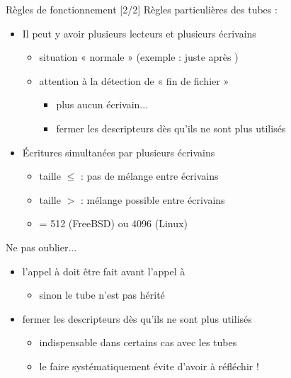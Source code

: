 \begin {frame} {Règles de fonctionnement [2/2]}
    Règles particulières des tubes :
    \begin {itemize}
	\item Il peut y avoir plusieurs lecteurs et plusieurs écrivains
	    \begin {itemize}
		\item situation « normale » (exemple : juste après )
		\item attention à la détection de « fin de fichier »
		    \begin {itemize}
			\item plus aucun écrivain...
			\item \implique fermer les descripteurs dès
			    qu'ils ne sont plus utilisés
		    \end {itemize}
	    \end {itemize}

	\item Écritures simultanées par plusieurs écrivains
	    \begin {itemize}
		\item taille $\leq$  : pas de mélange
		    entre écrivains
		\item taille $>$  : mélange possible
		    entre écrivains
		\item {} = 512 (FreeBSD) ou 4096 (Linux)
	    \end {itemize}

    \end {itemize}
\end {frame}

\begin {frame} {Ne pas oublier...}
    \begin {block} {}

    \begin {itemize}
	\item l'appel à  doit être fait \alert {avant}
	    l'appel à 
	    \begin {itemize}
		\item sinon le tube n'est pas hérité
	    \end {itemize}
	\item \alert {fermer} les descripteurs dès qu'ils ne sont
	    plus utilisés
	    \begin {itemize}
		\item indispensable dans certains cas avec les tubes
		\item \implique le faire systématiquement évite d'avoir
		    à réfléchir !
	    \end {itemize}
    \end {itemize}
    \end {block}
\end {frame}

